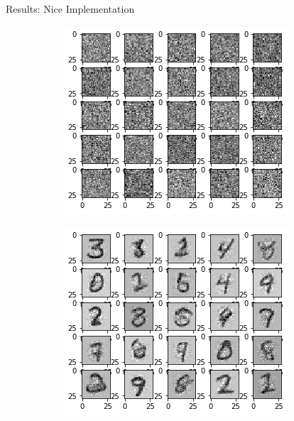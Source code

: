 \begin{frame}{Results: Nice Implementation}
    \begin{figure}[htbp!]
     \centering
     \begin{subfigure}[b]{0.3\textwidth}
         \centering
         \includegraphics[width=\textwidth]{Images/prior1.png}
     \end{subfigure} 
     \hfill
     \begin{subfigure}[b]{0.3\textwidth}
         \centering
         \includegraphics[width=\textwidth]{Images/mnist1.png}

\end{subfigure}
\end{figure}
\end{frame}
